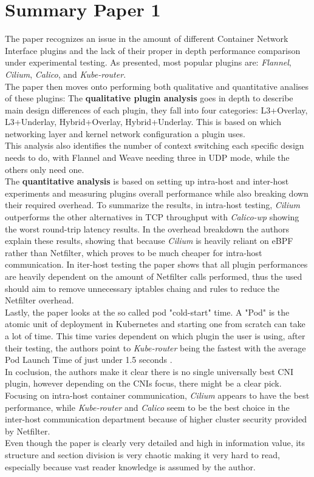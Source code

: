 \section{Summary Paper 1}%
\label{sec:Summary Paper 1}
The paper recognizes an issue in the amount of different Container Network Interface plugins and the lack of their  proper in depth performance comparison under experimental testing.
As presented, most popular plugins are: \textit{Flannel}, \textit{Cilium}, \textit{Calico}, and \textit{Kube-router}.\\
The paper then moves onto performing both qualitative and quantitative analises of these plugins:
The \textbf{qualitative plugin analysis} goes in depth to describe main design differences of each plugin, they fall into four categories: L3+Overlay, L3+Underlay, Hybrid+Overlay, Hybrid+Underlay. This is based on which networking layer and kernel network configuration a plugin uses. \\This analysis also identifies the number of context switching each specific design needs to do, with Flannel and Weave needing three in UDP mode, while the others only need one.\\
The \textbf{quantitative analysis} is based on setting up intra-host and inter-host experiments and measuring plugins overall performance while also breaking down their required overhead. To summarize the results, in intra-host testing, \textit{Cilium} outperforms the other alternatives in TCP throughput with \textit{Calico-wp} showing the worst round-trip latency results. In the overhead breakdown the authors explain these results, showing that because \textit{Cilium} is heavily reliant on eBPF rather than Netfilter, which proves to be much cheaper for intra-host communication. In iter-host testing
the paper shows that all plugin performances are heavily dependent on the amount of Netfilter calls performed, thus the used should aim to remove unnecessary iptables chaing and rules to reduce the Netfilter overhead.\\
Lastly, the paper looks at the so called pod "cold-start" time. A "Pod" is the atomic unit of deployment in Kubernetes \cite{C1} and starting one from scratch can take a lot of time.
This time varies dependent on which plugin the user is using, after their testing, the authors point to \textit{Kube-router} being the fastest with the average Pod Launch Time of just under 1.5 seconds \cite{C1}.\\
In coclusion, the authors make it clear there is no single universally best CNI plugin, however depending on the CNIs focus, there might be a clear pick. Focusing on intra-host container communication, \textit{Cilium} appears to have the best performance, while \textit{Kube-router} and \textit{Calico} seem to be the best choice in the inter-host communication department because of higher cluster security provided by Netfilter.\\Even though the paper is clearly very detailed and high in information value, its structure and section division is very chaotic making it very hard to read, especially because vast reader knowledge is assumed by the author.
